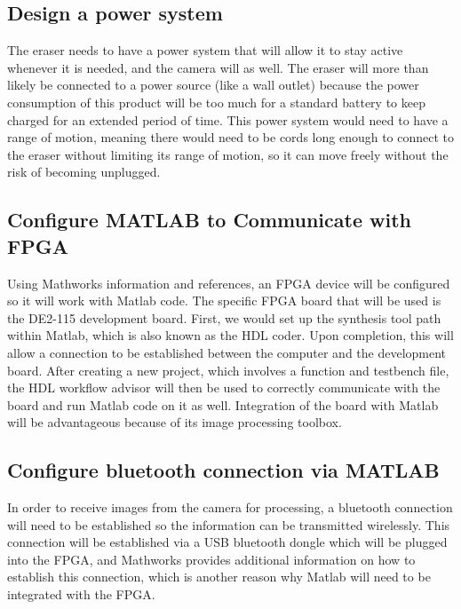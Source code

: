 \documentclass{IEEEtran}					%
\begin{document}
	\subsection{Design a power system}
	The eraser needs to have a power system that will allow it to stay active whenever it is needed, and the camera will as well. The eraser will more than likely be connected to a power source (like a wall outlet) because the power consumption of this product will be too much for a standard battery to keep charged for an extended period of time. This power system would need to have a range of motion, meaning there would need to be cords long enough to connect to the eraser without limiting its range of motion, so it can move freely without the risk of becoming unplugged. 
	\subsection{Configure MATLAB to Communicate with FPGA}
	Using Mathworks information and references, an FPGA device will be configured so it will work with Matlab code. The specific FPGA board that will be used is the DE2-115 development board. First, we would set up the synthesis tool path within Matlab, which is also known as the HDL coder. Upon completion, this will allow a connection to be established between the computer and the development board. After creating a new project, which involves a function and testbench file, the HDL workflow advisor will then be used to correctly communicate with the board and run Matlab code on it as well. Integration of the board with Matlab will be advantageous because of its image processing toolbox.
	
	\subsection{Configure bluetooth connection via MATLAB}
	In order to receive images from the camera for processing, a bluetooth connection will need to be established so the information can be transmitted wirelessly. This connection will be established via a USB bluetooth dongle which will be plugged into the FPGA, and Mathworks provides additional information on how to establish this connection, which is another reason why Matlab will need to be integrated with the FPGA.
\end{document}
